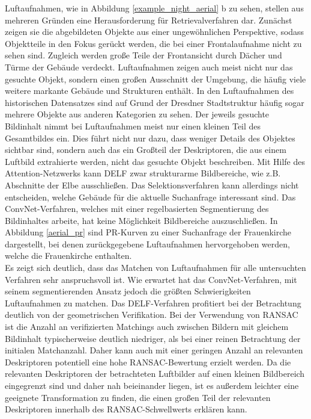 Luftaufnahmen, wie in Abbildung \ref{example_night_aerial} b zu sehen, stellen aus mehreren Gründen eine Herausforderung für Retrievalverfahren dar. Zunächst zeigen sie die abgebildeten Objekte aus einer ungewöhnlichen Perspektive, sodass Objektteile in den Fokus gerückt werden, die bei einer Frontalaufnahme nicht zu sehen sind. Zugleich werden große Teile der Frontansicht durch Dächer und Türme der Gebäude verdeckt. Luftaufnahmen zeigen auch meist nicht nur das gesuchte Objekt, sondern einen großen Ausschnitt der Umgebung, die häufig viele weitere markante Gebäude und Strukturen enthält. In den Luftaufnahmen des historischen Datensatzes sind auf Grund der Dresdner Stadtstruktur häufig sogar mehrere Objekte aus anderen Kategorien zu sehen. Der jeweils gesuchte Bildinhalt nimmt bei Luftaufnahmen meist nur einen kleinen Teil des Gesamtbildes ein. Dies führt nicht nur dazu, dass weniger Details des Objektes sichtbar sind, sondern auch das ein Großteil der Deskriptoren, die aus einem Luftbild extrahierte werden, nicht das gesuchte Objekt beschreiben. Mit Hilfe des Attention-Netzwerks kann DELF zwar strukturarme Bildbereiche, wie z.B. Abschnitte der Elbe ausschließen. Das Selektionsverfahren kann allerdings nicht entscheiden, welche Gebäude für die aktuelle Suchanfrage interessant sind. Das ConvNet-Verfahren, welches mit einer regelbasierten Segmentierung des Bildinhaltes arbeite, hat keine Möglichkeit Bildbereiche auszuschließen. In Abbildung \ref{aerial_pr} sind PR-Kurven zu einer Suchanfrage der Frauenkirche dargestellt, bei denen zurückgegebene Luftaufnahmen hervorgehoben werden, welche die Frauenkirche enthalten.
\\
Es zeigt sich deutlich, dass das Matchen von Luftaufnahmen für alle untersuchten Verfahren sehr anspruchsvoll ist. Wie erwartet hat das ConvNet-Verfahren, mit seinem segmentierenden Ansatz jedoch die größten Schwierigkeiten Luftaufnahmen zu matchen. Das DELF-Verfahren profitiert bei der Betrachtung deutlich von der geometrischen Verifikation. Bei der Verwendung von RANSAC ist die Anzahl an verifizierten Matchings auch zwischen Bildern mit gleichem Bildinhalt typischerweise deutlich niedriger, als bei einer reinen Betrachtung der initialen Matchanzahl. Daher kann auch mit einer geringen Anzahl an relevanten Deskriptoren potentiell eine hohe RANSAC-Bewertung erzielt werden. Da die relevanten Deskriptoren der betrachteten Luftbilder auf einen kleinen Bildbereich eingegrenzt sind und daher nah beieinander liegen, ist es außerdem leichter eine geeignete Transformation zu finden, die einen großen Teil der relevanten Deskriptoren innerhalb des RANSAC-Schwellwerts erklären kann. 
